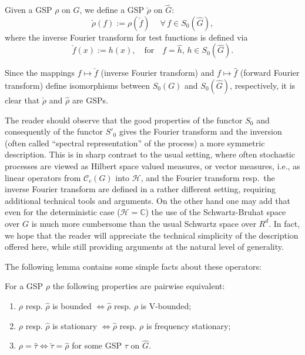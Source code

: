 \documentclass[graybox]{svmult}
\begin{document}
\begin{definition}
\label{ch18:def8}
Given a GSP $\rho $ on $G$, we define a
GSP $\check{\rho}$ on $\hat{G}$:
\[
 \check{\rho}(f) := \rho (\check{f}) \quad  \
\forall \,  f \in S_{0}(\hat{G}),
\]
where the inverse Fourier transform for test functions
is defined via
\[
 \check{f}(x) := h(x), \quad \mbox{for} \quad f = \hat{h} , \,
 h \in S_{0}(\hat{G}).
\]
\end{definition} %

\par
\medskip
 Since the mappings $f \mapsto \check{f}$ (inverse Fourier transform)
and $f \mapsto \hat{f}$ (forward Fourier transform)
define isomorphisms between ${S_{0}(G)}$ and $S_{0}(\hat{G})$, respectively, it is clear that $\check{\rho}$ and $\hat{\rho}$ are GSPs.



 
The reader should observe that the good properties of the functor
 $S_0$ and consequently of the functor  ${S'_0}$
gives the Fourier transform and the inversion (often called
``spectral representation'' of the process) a more symmetric
description. This is in sharp contrast to the usual setting,
where often stochastic processes are
viewed  as Hilbert space valued measures, or vector measures,
i.e.,  as linear operators
from $\mathcal{C}_c(G)$ into  $\mathcal{H}$, and the Fourier transform
resp.\ the inverse Fourier transform are defined in a rather
different setting, requiring additional technical tools and
arguments. On the other hand one may add that even for the
deterministic case ($\mathcal{H} = \mathbb{C}$) the use of the
Schwartz-Bruhat space over $G$ is much more cumbersome
than the usual Schwartz space over $R^d$. In fact, we hope
that the reader will appreciate the technical simplicity
of the description offered here, while still providing
arguments at the natural level of generality.

The following lemma contains some simple facts about these operators:
\newpage  %

\setcounter{lemma}{2}
\begin{lemma}\label{ch18:lem3}
For a GSP $\rho $ the following properties are pairwise equivalent:
\begin{enumerate}\leftskip5pt
\item[(a)]
$\rho $ resp.  $ \hat{\rho} $ is bounded $\Longleftrightarrow \hat{\rho} $ resp.  $\rho $ is V-bounded;

\item[(b)] $\rho $ resp. $ \hat{\rho} $
is stationary $\Longleftrightarrow \hat{\rho} $ resp.  $\rho $ is
frequency stationary;

\item[(c)] $\rho = \hat{\tau} \Longleftrightarrow
\check{\tau} = \hat{\rho}$ for some GSP $\tau$ on $\hat G$.
\end{enumerate}
\end{lemma}
\end{document}
